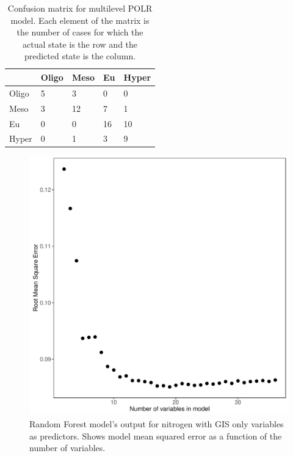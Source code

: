 \documentclass[fleqn,10pt]{wlpeerj} %
\begin{document}
\begin{table}[ht]
\caption {Confusion matrix for multilevel POLR model. Each element of the matrix is the number of cases for which the actual state is the row and the predicted state is the column.}
\label{tab:MultiPOLRCM}
\centering
\begin{tabular}{lllll}
  \hline
 & Oligo & Meso & Eu & Hyper \\ 
  \hline
  Oligo & 5 & 3 & 0 & 0 \\
  Meso & 3 & 12 & 7 & 1 \\
  Eu & 0 & 0 & 16 & 10 \\
  Hyper & 0 & 1 & 3 & 9 \\
   \hline
\end{tabular}
\end{table}

\begin{figure}
  \includegraphics[scale=0.5]{gis_vs_NTL.pdf}
  \caption{Random Forest model's output for nitrogen with GIS only variables as predictors. Shows model mean squared error as a function of the number of variables.}
  \label{fig:gis_vs_NTL}
\end{figure}
\end{document}
